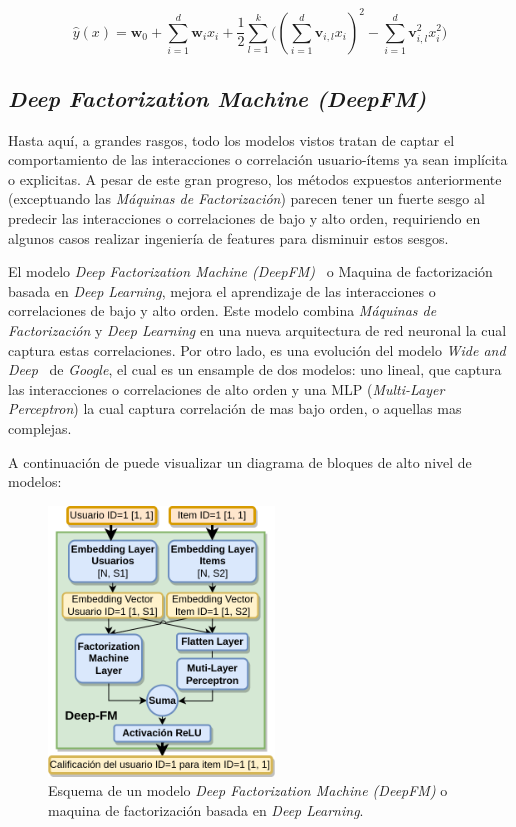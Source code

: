 \documentclass[11pt,a4paper,twoside]{thesis}
\begin{document}
\begin{equation}
	\hat{y}(x) = \mathbf{w}_0 + \sum_{i=1}^d \mathbf{w}_i x_i + \frac{1}{2} \sum_{l=1}^k \big ((\sum_{i=1}^d \mathbf{v}_{i, l} x_i)^2 - \sum_{i=1}^d \mathbf{v}_{i, l}^2 x_i^2)
\end{equation}

\clearpage

\subsection{\textit{Deep Factorization Machine (DeepFM)}}

Hasta aquí, a grandes rasgos, todo los modelos vistos tratan de captar el
comportamiento de las interacciones o correlación usuario-ítems ya sean
implícita o explicitas. A pesar de este gran progreso, los métodos expuestos
anteriormente (exceptuando las \textit{Máquinas de Factorización}) parecen
tener un fuerte sesgo al predecir las interacciones o correlaciones de bajo y
alto orden, requiriendo en algunos casos realizar ingeniería de features para
disminuir estos sesgos.

El modelo \textit{Deep Factorization Machine (DeepFM)}~\cite{dfmpaper, didldfm}
o Maquina de factorización basada en \textit{Deep Learning}, mejora el
aprendizaje de las interacciones o correlaciones de bajo y alto orden. Este
modelo combina \textit{Máquinas de Factorización} y \textit{Deep Learning} en
una nueva arquitectura de red neuronal la cual captura estas correlaciones. Por
otro lado, es una evolución del modelo \textit{Wide and
	Deep}~\cite{wideanddeeppaper} de \textit{Google}, el cual es un ensample de dos
modelos: uno lineal, que captura las interacciones o correlaciones de alto
orden y una MLP (\textit{Multi-Layer Perceptron}) la cual captura correlación
de mas bajo orden, o aquellas mas complejas.

A continuación de puede visualizar un diagrama de bloques de alto nivel de
modelos:

\begin{figure}[h!]
	\centering
	\includegraphics[width=6cm]{./images/Deep-MF.png}
	\caption{
		Esquema de un modelo \textit{Deep Factorization Machine (DeepFM)} o maquina de factorización basada en \textit{Deep Learning}.
	}
	\label{fig:DeepMFModel}
\end{figure}
\end{document}
